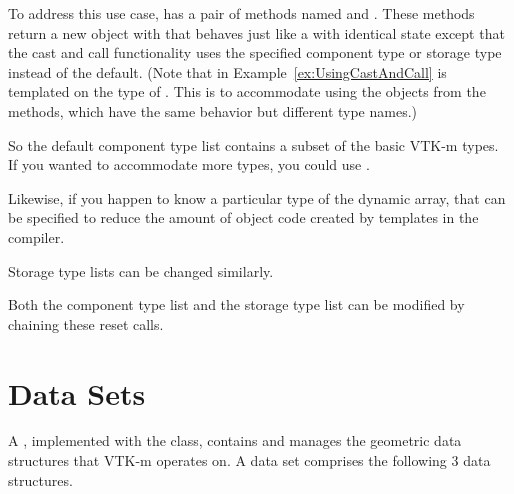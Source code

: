 To address this use case,  has a pair of
methods named  and
. These methods return a new object with that
behaves just like a  with identical
state except that the cast and call functionality uses the specified
component type or storage type instead of the default. (Note that
 in Example~\ref{ex:UsingCastAndCall} is
templated on the type of . This is to
accommodate using the objects from the  methods, which
have the same behavior but different type names.)

So the default component type list contains a subset of the basic VTK-m
types. If you wanted to accommodate more types, you could use
.


Likewise, if you happen to know a particular type of the dynamic array,
that can be specified to reduce the amount of object code created by
templates in the compiler.


Storage type lists can be changed similarly.


Both the component type list and the storage type list can be modified by
chaining these reset calls.




\section{Data Sets}
\label{sec:DataSets}


A , implemented with the  class,
contains and manages the geometric data structures that VTK-m operates on.
A data set comprises the following 3 data structures.

